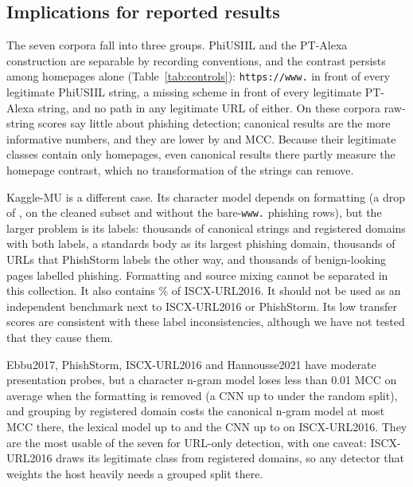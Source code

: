 \subsection{Implications for reported results}
The seven corpora fall into three groups. PhiUSIIL and the PT-Alexa construction are separable by recording conventions, and the contrast persists among homepages alone (Table~\ref{tab:controls}): \texttt{https://www.} in front of every legitimate PhiUSIIL string, a missing scheme in front of every legitimate PT-Alexa string, and no path in any legitimate URL of either. On these corpora raw-string scores say little about phishing detection; canonical results are the more informative numbers, and they are lower by \DRawVsCanonPhiUSIIL{} and \DRawVsCanonPTAlexa{} MCC. Because their legitimate classes contain only homepages, even canonical results there partly measure the homepage contrast, which no transformation of the strings can remove.

Kaggle-MU is a different case. Its character model depends on formatting (a drop of \DRawVsCanonKaggleMU, \KCleanDrop{} on the cleaned subset and \KCleanTwoDrop{} without the bare-\texttt{www.} phishing rows), but the larger problem is its labels: thousands of canonical strings and registered domains with both labels, a standards body as its largest phishing domain, thousands of URLs that PhishStorm labels the other way, and thousands of benign-looking pages labelled phishing. Formatting and source mixing cannot be separated in this collection. It also contains \ISCXInKagglePct\% of ISCX-URL2016. It should not be used as an independent benchmark next to ISCX-URL2016 or PhishStorm. Its low transfer scores are consistent with these label inconsistencies, although we have not tested that they cause them.

Ebbu2017, PhishStorm, ISCX-URL2016 and Hannousse2021 have moderate presentation probes, but a character n-gram model loses less than 0.01 MCC on average when the formatting is removed (a CNN up to \CNNDropHannousseRandom{} under the random split), and grouping by registered domain costs the canonical n-gram model at most \DCanonRandomVsDomainPhishStorm{} MCC there, the lexical model up to \DLexicalRandomVsDomainISCXURL{} and the CNN up to \CNNGroupCostISCXURL{} on ISCX-URL2016. They are the most usable of the seven for URL-only detection, with one caveat: ISCX-URL2016 draws its legitimate class from \RegLegitISCXURL{} registered domains, so any detector that weights the host heavily needs a grouped split there.

